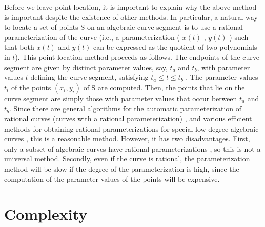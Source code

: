 Before we leave point location, it is important
to explain why the above method is important despite the
existence of other methods.
In particular, a natural way to locate a set of points S on an algebraic 
curve segment is to use a rational parameterization
of the curve (i.e., a parameterization ( $x(t)$ , $y(t)$ ) such that both
$x(t)$ and $y(t)$ can be expressed as the quotient of two polynomials in $t$). 
This point location method proceeds as follows.
The endpoints of the curve segment are given by distinct parameter 
values, say, ${t_a}$ and ${t_b}$, with parameter values $t$ defining the 
curve segment, satisfying ${t_a} \leq t \leq {t_b}$ . 
The parameter values $t_{i}$ of the points $(x_{i},y_{i})$ of S 
are computed.
Then, the points that lie on the curve segment are simply those
with parameter values that occur between $t_a$ and $t_b$.
Since there are general algorithms for the 
automatic parameterization of rational curves (curves with a rational
parameterization) \cite{abba3}, and
various efficient methods for obtaining rational
parameterizations for special low degree algebraic 
curves \cite{abba1,abba2,levi,ock}, this is a reasonable method.
However, it has two disadvantages.
First, only a subset of algebraic curves have rational 
parameterizations \cite{walker}, so this is not a universal method.
Secondly, even if the curve is rational, the parameterization method will be 
slow if the degree of the parameterization is high, since the computation
of the parameter values of the points will be expensive.

%
%
%
%
\section{Complexity}

